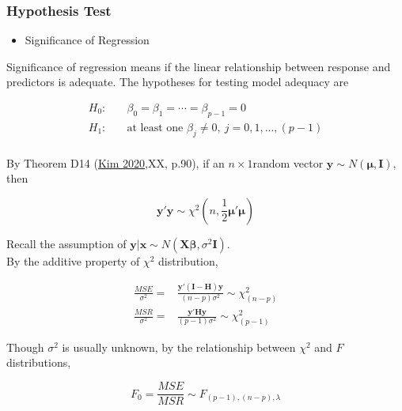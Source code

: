 \documentclass[
  11pt,
  openany]{memoir}
\providecommand{\tightlist}{%
  \setlength{\itemsep}{0pt}\setlength{\parskip}{0pt}}
\begin{document}
\hypertarget{hypothesis-test}{%
\subsubsection{Hypothesis Test}\label{hypothesis-test}}

\begin{itemize}
\tightlist
\item
  Significance of Regression
\end{itemize}

Significance of regression means if the linear relationship between response and predictors is adequate. The hypotheses for testing model adequacy are

\begin{equation}
\begin{split}
H_0:&\quad \beta_0 = \beta_1 = \cdots =\beta_{p-1}=0\\
H_1:&\quad \text{at least one } \beta_j \neq 0,\ j=0,1,...,(p-1)\\
\end{split}
\label{eq:hyp-1}
\end{equation}

By Theorem D14 (\protect\hyperlink{ref-kimLectureNotes2020}{Kim 2020},XX, p.90), if an \(n\times1\)random vector \(\mathbf{y}\sim N(\boldsymbol{\mu},\mathbf{I})\), then

\begin{equation}
\mathbf{y'y} \sim \chi^2(n,\frac12\boldsymbol{\mu'\mu})
\label{eq:chisq}
\end{equation}

Recall the assumption of \(\mathbf{y|x}\sim N (\mathbf{X}\boldsymbol{\beta},\sigma^2\mathbf{I})\).\\
By the additive property of \(\chi^2\) distribution,

\begin{equation}
\begin{split}
\frac{MSE}{\sigma^2}=&\frac{\mathbf{y'(I-H)y}}{(n-p)\sigma^2} \sim \chi^2_{(n-p)}\\
\frac{MSR}{\sigma^2}=&\frac{\mathbf{y'Hy}}{(p-1)\sigma^2} \sim \chi^2_{(p-1)}
\end{split}
\label{eq:msemsr}
\end{equation}

Though \(\sigma^2\) is usually unknown, by the relationship between \(\chi^2\) and \(F\) distributions,

\begin{equation}
F_0=\frac{MSE}{MSR} \sim F_{(p-1),(n-p),\lambda}
\end{equation}
\end{document}
